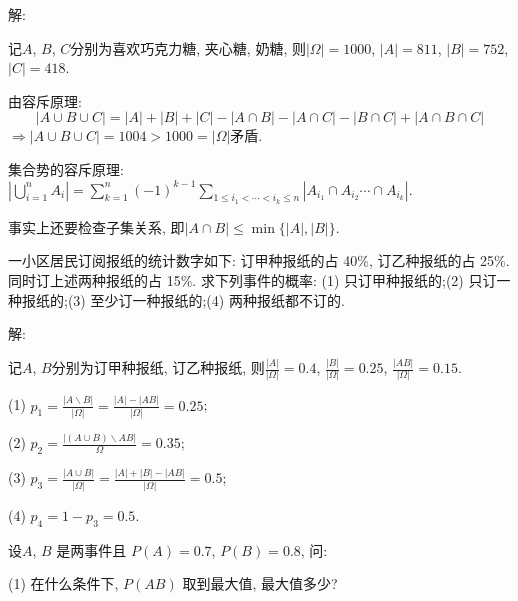 \documentclass[standard]{ExBook}
\renewenvironment{shaded}{%
  \def\FrameCommand{\fboxsep=\FrameSep \colorbox{shadecolor}}%
  \MakeFramed{\advance\hsize-\width \FrameRestore}%
}{%
  \endMakeFramed
}
\begin{document}
\begin{qitems}
\vspace{\dimexpr2.5cm-5em\relax}

解:

记$A$, $B$, $C$分别为喜欢巧克力糖, 夹心糖, 奶糖, 则$|\Omega|=1000$, $|A|=811$, $|B|=752$, $|C|=418$.

由容斥原理: 
$$|A\cup B\cup C|=|A|+|B|+|C|-|A\cap B|-|A\cap C|-|B\cap C|+|A\cap B\cap C|$$
$\Longrightarrow$$|A\cup B\cup C|=1004 > 1000=|\Omega|$矛盾.

\textcolor{themeColor}{\selectfont {} 集合势的容斥原理: $|\bigcup\limits_{i=1}^{n}A_{i}|=\sum\limits_{k=1}^{n}(-1)^{k-1}\sum\limits_{1\leq i_{1}<\cdots<i_{k}\leq n}|A_{i_{1}}\cap A_{i_{2}}\cdots\cap A_{i_{k}}|$.}

\textcolor{themeColor}{\selectfont {} 事实上还要检查子集关系, 即$|A\cap B|\leq\min\{|A|,|B|\}$.}

\vspace{2.5cm-5em}

    \begin{bbox}
    \begin{shaded}
        \qitem
一小区居民订阅报纸的统计数字如下: 订甲种报纸的占 40\%, 订乙种报纸的占 25\%. 同时订上述两种报纸的占 15\%. 求下列事件的概率: (1) 只订甲种报纸的;\qquad(2) 只订一种报纸的;\qquad(3) 至少订一种报纸的;\qquad(4) 两种报纸都不订的.
    \end{shaded}
    \end{bbox}

\vspace{\dimexpr2.5cm-5em\relax}

解: 

记$A$, $B$分别为订甲种报纸, 订乙种报纸, 则$\frac{|A|}{|\Omega|}=0.4$, $\frac{|B|}{|\Omega|}=0.25$, $\frac{|AB|}{|\Omega|}=0.15$.

(1) $p_{1}=\frac{|A\backslash B|}{|\Omega|}=\frac{|A|-|AB|}{|\Omega|}=0.25$;

(2) $p_{2}=\frac{|(A\cup B)\backslash AB|}{\Omega}=0.35$;

(3) $p_{3}=\frac{|A\cup B|}{|\Omega|}=\frac{|A|+|B|-|AB|}{|\Omega|}=0.5$;

(4) $p_{4}=1-p_{3}=0.5$.

\vspace{2.5cm-5em}

    \begin{bbox}
    \begin{shaded}
        \qitem
设$A$, $B$ 是两事件且 $P(A) = 0.7$, $P(B) = 0.8$, 问: 

(1) 在什么条件下, $P(AB)$ 取到最大值, 最大值多少? 


\end{shaded}
\end{bbox}
\end{qitems}
\end{document}
